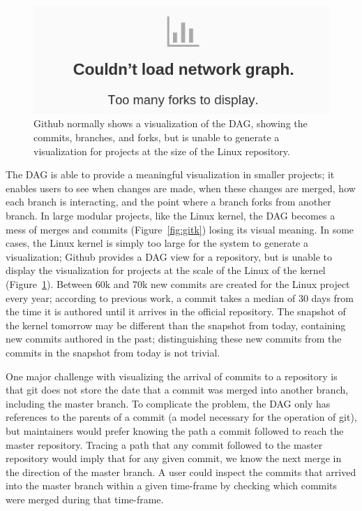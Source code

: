 \begin{figure}
        \centering
        \includegraphics[width=0.8\linewidth]{figures/github_viewer.png}
        \caption{Github normally shows a visualization of the DAG,
          showing the commits, branches, and forks, but is unable to
          generate a visualization for projects at the size of the Linux
          repository.}
        \label{fig:gitfail}
\end{figure}

The DAG is able to provide a meaningful visualization in smaller
projects; it enables users to see when changes are made, when these
changes are merged, how each branch is interacting, and the point where
a branch forks from another branch. In large modular projects, like
the Linux kernel, the DAG becomes a mess of merges and commits
(Figure~\ref{fig:gitk}) losing its visual meaning. In some cases, the
Linux kernel is simply too large for the system to generate a
visualization; Github provides a DAG view for a repository, but is
unable to display the visualization for projects at the scale of the
Linux of the kernel (Figure~\ref{fig:gitfail}). Between 60k and 70k new
commits are created for the Linux project every year; according to
previous work\cite{German2015}, a commit takes a median of 30 days from
the time it is authored until it arrives in the official repository. The
snapshot of the kernel tomorrow may be different than the snapshot from
today, containing new commits authored in the past; distinguishing these
new commits from the commits in the snapshot from today is not trivial.

One major challenge with visualizing the arrival of commits to a
repository is that git does not store the date that a commit was merged
into another branch, including the master branch. To complicate the
problem, the DAG only has references to the parents of a commit (a
model necessary for the operation of git), but maintainers would prefer
knowing the path a commit followed to reach the master repository.
Tracing a path that any commit followed to the master repository would
imply that for any given commit, we know the next merge in the direction
of the master branch. A user could inspect the commits that arrived into
the master branch within a given time-frame by checking which commits
were merged during that time-frame.

